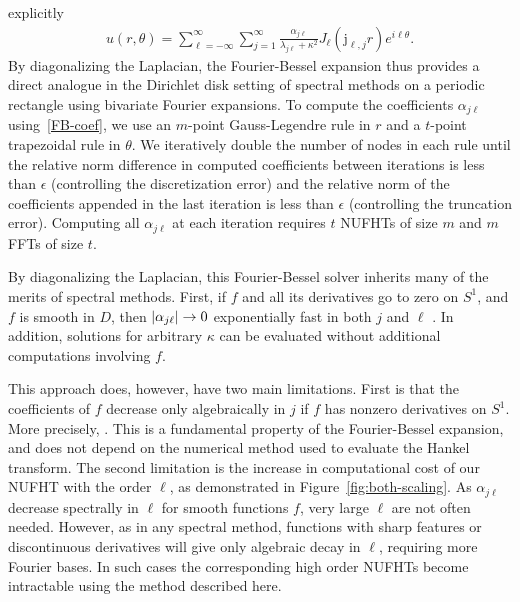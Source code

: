 explicitly
\begin{align}
  u(r,\theta) = \sum_{\ell=-\infty}^\infty \sum_{j=1}^\infty \frac{\alpha_{j\ell}}{\lambda_{j\ell} + \kappa^2} J_\ell(\mathrm{j}_{\ell,j}r) e^{i\ell\theta}.
\end{align}
By diagonalizing the Laplacian, the Fourier-Bessel expansion thus provides a
direct analogue in the Dirichlet disk setting of spectral methods on a periodic
rectangle using bivariate Fourier expansions. To compute the coefficients
$\alpha_{j\ell}$ using~\eqref{FB-coef}, we use an $m$-point Gauss-Legendre rule
in $r$ and a $t$-point trapezoidal rule in $\theta$. We iteratively double the
number of nodes in each rule until the relative norm difference in computed
coefficients between iterations is less than $\epsilon$ (controlling the
discretization error) and the relative norm of the coefficients appended in the
last iteration is less than $\epsilon$ (controlling the truncation error).
Computing all $\alpha_{j\ell}$ at each iteration requires $t$ NUFHTs of size $m$
and $m$ FFTs of size $t$. 

By diagonalizing the Laplacian, this Fourier-Bessel solver inherits many of the
merits of spectral methods. First, if $f$ and all its derivatives go to zero on
$S^1$, and $f$ is smooth in $D$, then $\left|\alpha_{j\ell}\right| \to 0$ exponentially
fast in both $j$ and $\ell$ \cite{boyd2011comparing}. In addition, solutions for
arbitrary $\kappa$ can be evaluated without additional computations involving
$f$.

This approach does, however, have two main limitations. First is that the
coefficients of $f$ decrease only algebraically in $j$ if $f$ has nonzero
derivatives on $S^1$. More precisely, .  This is a fundamental property of the
Fourier-Bessel expansion, and does not depend on the numerical method used to
evaluate the Hankel transform. The second limitation is the increase in
computational cost of our NUFHT with the order $\ell$, as demonstrated in
Figure~\ref{fig:both-scaling}. As $\alpha_{j\ell}$ decrease spectrally in $\ell$
for smooth functions $f$, very large $\ell$ are not often needed. However, as in
any spectral method, functions with sharp features or discontinuous derivatives
will give only algebraic decay in $\ell$, requiring more Fourier bases. In such
cases the corresponding high order NUFHTs become intractable using the method
described here. 


